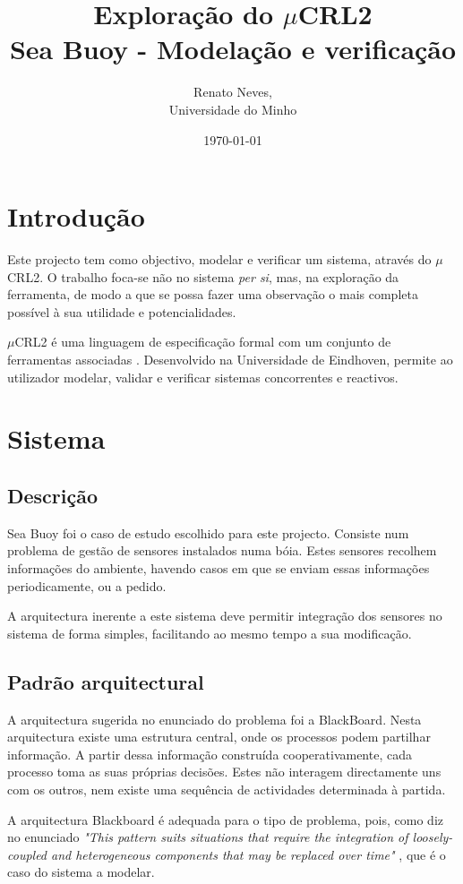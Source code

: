 \documentclass[a4paper,11pt]{article}
\newcommand{\mc}{$\mu$CRL2}
\begin{document}
\title{  Exploração do \(\mu\)CRL2 \\ Sea Buoy - Modelação e verificação  }

\author{Renato Neves, \\ Universidade do Minho}
\date{\today}
\maketitle
\pagebreak


\section{Introdução}
Este projecto tem como objectivo, modelar e verificar um sistema, através do \mc. O trabalho 
foca-se não no sistema \emph{per si}, mas, na exploração da ferramenta, de modo a que
se possa fazer uma observação o mais completa possível à sua utilidade e potencialidades. \par
\mc\xspace é uma linguagem de especificação formal com um conjunto de ferramentas associadas 
\cite{ref1}. Desenvolvido na Universidade de Eindhoven, 
permite ao utilizador modelar, validar e verificar sistemas concorrentes e reactivos. \par  

\section{Sistema}

\subsection{Descrição} 

Sea Buoy foi o caso de estudo escolhido para este projecto. Consiste num problema de gestão de 
sensores instalados numa bóia. Estes sensores recolhem informações
do ambiente, havendo casos em que se enviam essas informações periodicamente, ou a pedido. 
\par A arquitectura inerente a este sistema deve permitir integração dos sensores no 
sistema de forma simples, facilitando ao mesmo tempo a sua modificação.  

\subsection{Padrão arquitectural }

A arquitectura sugerida no enunciado do problema foi a BlackBoard. 
Nesta arquitectura existe uma estrutura central, onde os processos podem partilhar informação. 
A partir dessa informação construída cooperativamente, cada processo toma as
suas próprias decisões. 
Estes não interagem directamente uns com os outros, nem existe 
uma sequência de actividades determinada à partida. \par
A arquitectura Blackboard é adequada para o tipo de problema, pois, 
como diz no enunciado \emph {"This pattern 
suits situations that require the integration of loosely-coupled and 
heterogeneous components that may be replaced over time" } \cite{ref4}, que é o caso do sistema
a modelar. 
\end{document}
